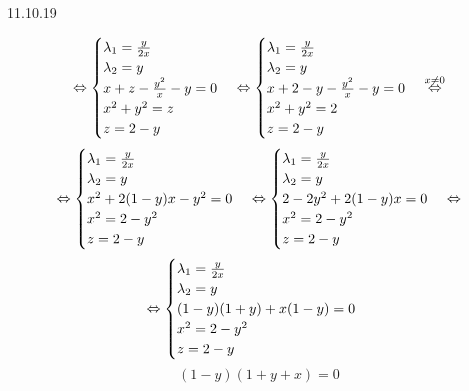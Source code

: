 \documentclass[matan.tex]{subfiles}
\begin{document}
\begin{lect} {11.10.19}
\begin{Task}[3]
            \[\Leftrightarrow \begin{cases}
                \lambda_1 = \frac{y}{2x}\\
                \lambda_2 = y\\
                x + z - \frac{y^2}{x} - y = 0\\
                x^2 + y^2 = z\\
                z = 2 - y
            \end{cases} \Leftrightarrow \begin{cases}
                \lambda_1 = \frac{y}{2x}\\
                \lambda_2 = y\\
                x + 2 - y - \frac{y^2}{x} - y = 0\\
                x^2 + y^2 = 2\\
                z = 2 - y
            \end{cases} \overset{x \neq 0}{ \Leftrightarrow}\]
            \[\Leftrightarrow \begin{cases}
                \lambda_1 = \frac{y}{2x}\\
                \lambda_2 = y\\
                x^2 + 2(1 - y)x - y^2 = 0\\
                x^2 = 2 - y^2\\
                z = 2 - y
            \end{cases} \Leftrightarrow \begin{cases}
                \lambda_1 = \frac{y}{2x}\\
                \lambda_2 = y\\
                2 - 2y^2 + 2(1 - y)x = 0\\
                x^2 = 2 - y^2\\
                z = 2 - y
            \end{cases} \Leftrightarrow\]
            \[\Leftrightarrow \begin{cases}
                \lambda_1 = \frac{y}{2x}\\
                \lambda_2 = y\\
                (1 - y)(1 + y) + x(1 - y) = 0\\
                x^2 = 2 - y^2\\
                z = 2 - y
            \end{cases}\]
            \[(1 - y)(1 + y + x) = 0\]


\end{Task}
\end{lect}
\end{document}
